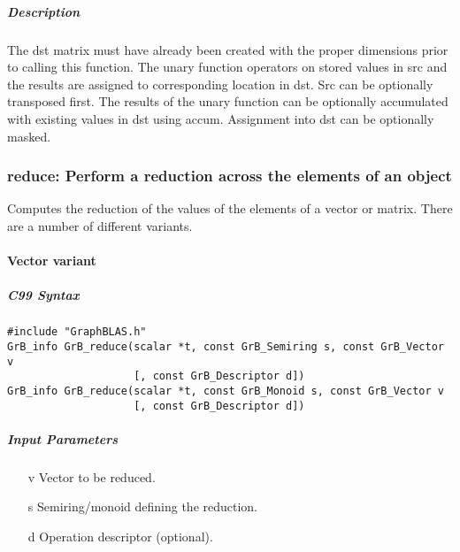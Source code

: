 \subparagraph{Description}

The dst matrix must have already been created with the proper dimensions
prior to calling this function.  The unary function operators on stored values in src and the results are assigned to corresponding location in dst.
Src can be optionally transposed first.  The results of the unary function can be optionally accumulated with existing values in dst using accum.  Assignment into dst can be optionally masked.


\subsubsection{{\sf reduce}: Perform a reduction across the elements of an object}

Computes the reduction of the values of the elements of a vector or matrix.  There are a number of different variants.

\paragraph{Vector variant}

\subparagraph{C99 Syntax}

\begin{verbatim}
#include "GraphBLAS.h"
GrB_info GrB_reduce(scalar *t, const GrB_Semiring s, const GrB_Vector v
                    [, const GrB_Descriptor d])
GrB_info GrB_reduce(scalar *t, const GrB_Monoid s, const GrB_Vector v
                    [, const GrB_Descriptor d])
\end{verbatim}



\subparagraph{Input Parameters}

\begin{itemize}
	\item[{\sf v}] Vector to be reduced.
	\item[{\sf s}] Semiring/monoid defining the reduction.
	\item[{\sf d}] Operation descriptor (optional).
\end{itemize}

